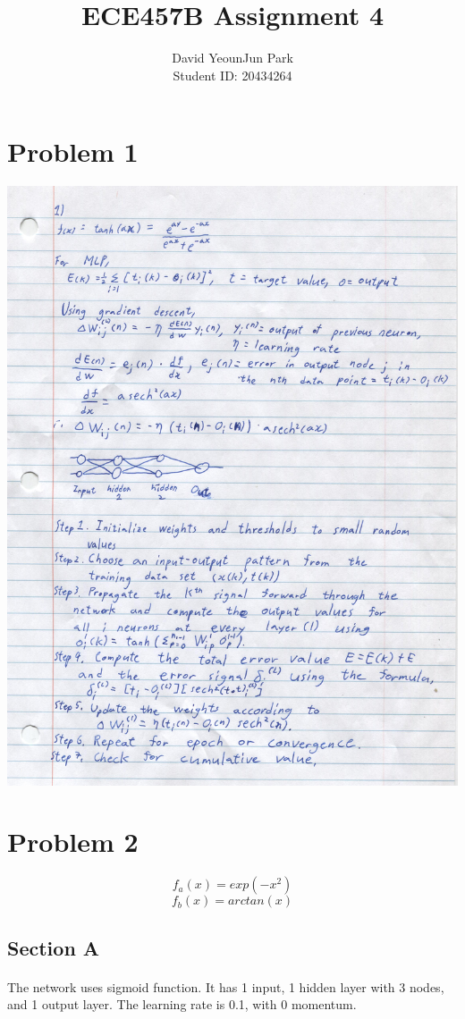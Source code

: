 \documentclass[12pt, letterpaper]{report}
\title{ECE457B Assignment 4}
\author{David YeounJun Park \\ Student ID: 20434264}
\begin{document}
\begin{titlepage}
\maketitle
\end{titlepage}

\section*{Problem 1}
\includegraphics[scale=0.8]{001.jpg}
\section*{Problem 2}
\[f_a(x) = exp(-x^2)\]
\[f_b(x) = arctan(x)\]
\subsection*{Section A}
\paragraph*{} The network uses sigmoid function. It has 1 input, 1 hidden layer with 3 nodes, and 1 output layer. The learning rate is 0.1, with 0 momentum.
\end{document}
